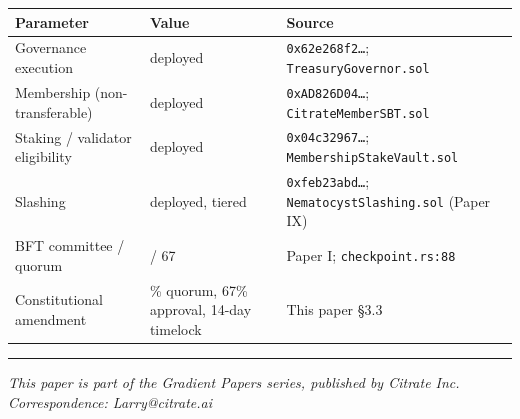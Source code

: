 {\def\LTcaptype{none} %
\begin{longtable}[]{@{}
  >{\raggedright\arraybackslash}p{}
  >{\raggedright\arraybackslash}p{}
  >{\raggedright\arraybackslash}p{}@{}}
\toprule\noalign{}
\begin{minipage}[b]{\linewidth}\raggedright
Parameter
\end{minipage} & \begin{minipage}[b]{\linewidth}\raggedright
Value
\end{minipage} & \begin{minipage}[b]{\linewidth}\raggedright
Source
\end{minipage} \\
\midrule\noalign{}
\endhead
\bottomrule\noalign{}
\endlastfoot
Governance execution & deployed & \texttt{0x62e268f2…};
\texttt{TreasuryGovernor.sol} \\
Membership (non-transferable) & deployed & \texttt{0xAD826D04…};
\texttt{CitrateMemberSBT.sol} \\
Staking / validator eligibility & deployed & \texttt{0x04c32967…};
\texttt{MembershipStakeVault.sol} \\
Slashing & deployed, tiered & \texttt{0xfeb23abd…};
\texttt{NematocystSlashing.sol} (Paper IX) \\
BFT committee / quorum & 100 / 67 & Paper I;
\texttt{checkpoint.rs:88} \\
Constitutional amendment & 50\% quorum, 67\% approval, 14-day timelock &
This paper §3.3 \\
\end{longtable}
}

\begin{center}\rule{0.5\linewidth}{0.5pt}\end{center}

\emph{This paper is part of the Gradient Papers series, published by
Citrate Inc.} \emph{Correspondence: Larry@citrate.ai}
